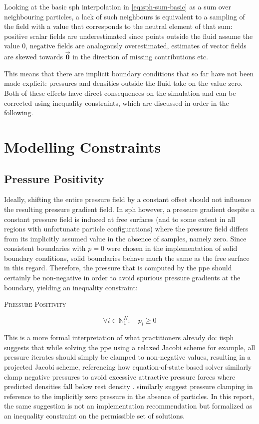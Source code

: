 \documentclass[conference]{IEEEtran}
\newcommand\vek[1]{\vec{\bm{#1}}}
\newcommand{\equationnamed}[2]{%
  \setlength{\fboxsep}{2pt} %
  \setlength{\fboxrule}{0.01pt}
  \begin{center}
    \begin{minipage}{\linewidth}
      \begin{center}\textsc{#1}\end{center}
      #2
    \end{minipage}
  \end{center}
}
\begin{document}
Looking at the basic \ac{sph} interpolation in \autoref{eq:sph-sum-basic} as a sum over neighbouring particles, a lack of such neighbours is equivalent to a sampling of the field with a value that corresponds to the neutral element of that sum: positive scalar fields are underestimated since points outside the fluid assume the value $0$, negative fields are analogously overestimated, estimates of vector fields are skewed towards $\vek{0}$ in the direction of missing contributions etc. 

This means that there are implicit boundary conditions that so far have not been made explicit: pressures and densities outside the fluid take on the value zero. Both of these effects have direct consequences on the simulation and can be corrected using inequality constraints, which are discussed in order in the following.

\section{Modelling Constraints}
\subsection{Pressure Positivity}
Ideally, shifting the entire pressure field by a constant offset should not influence the resulting pressure gradient field. In \ac{sph} however, a pressure gradient despite a constant pressure field is induced at free surfaces (and to some extent in all regions with unfortunate particle configurations) where the pressure field differs from its implicitly assumed value in the absence of samples, namely zero. Since consistent boundaries \cite{consistent-boundaries} with $p=0$ were chosen in the implementation of solid boundary conditions, solid boundaries behave much the same as the free surface in this regard. Therefore, the pressure that is computed by the \ac{ppe} should certainly be non-negative in order to avoid spurious pressure gradients at the boundary, yielding an inequality constraint:
\equationnamed{Pressure Positivity}{
  \begin{equation}\label{eq:pressure-positive}
    \forall i\in\mathds{N}_1^N: \quad p_i \geq 0 
  \end{equation}
}
This is a more formal interpretation of what practitioners already do: \ac{iisph} \cite{iisph} suggests that while solving the \ac{ppe} using a relaxed Jacobi scheme for example, all pressure iterates should simply be clamped to non-negative values, resulting in a projected Jacobi scheme, referencing how equation-of-state based solver similarly clamp negative pressures to avoid excessive attractive pressure forces where predicted densities fall below rest density \cite{iisph}. \autocite[Other authors]{tutorial2019} similarly suggest pressure clamping in reference to the implicitly zero pressure in the absence of particles. In this report, the same suggestion is not an implementation recommendation but formalized as an inequality constraint on the permissible set of solutions.
\end{document}
